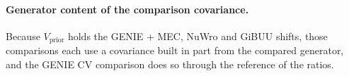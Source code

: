 
\paragraph{Generator content of the comparison covariance.} Because $V_{\mathrm{prior}}$ holds the GENIE + MEC, NuWro and GiBUU shifts, those comparisons each use a covariance built in part from the compared generator, and the GENIE CV comparison does so through the reference of the ratios.

